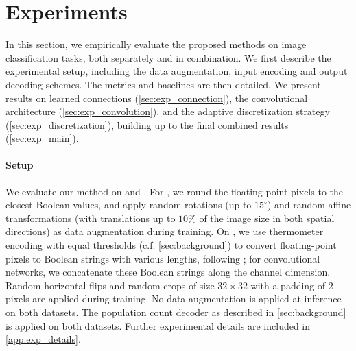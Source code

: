 \section{Experiments} \label{sec:experiments}

In this section, we empirically evaluate the proposed methods on image classification tasks, both separately and in combination. We first describe the experimental setup, including the data augmentation, input encoding and output decoding schemes. The metrics and baselines are
 then detailed. 
 We  present results on learned connections (\cref{sec:exp_connection}), the convolutional architecture (\cref{sec:exp_convolution}), and the adaptive discretization strategy (\cref{sec:exp_discretization}), building up to the final combined results (\cref{sec:exp_main}).

\paragraph{Setup} We evaluate our method on \mnist \citep{lecun1998gradient} and \cifar \citep{krizhevsky2009learning}. For \mnist, we round the floating-point pixels to the 
closest Boolean values,
and apply random rotations (up to $15^\circ$) and random affine transformations
 (with translations up to $10\%$ of the image size in both spatial directions) as 
 data augmentation during training. On \cifar, we use thermometer encoding with equal thresholds (c.f. \cref{sec:background})
 to convert floating-point pixels to Boolean strings
 with various lengths, following  \citet{petersen2022deep,petersen2024convolutional}; for convolutional networks, we concatenate these
Boolean strings
 along the channel dimension. Random horizontal flips and random crops of size $32 \times 32$ with a padding of 2 pixels are applied during training. No data augmentation is applied at inference on both datasets. The population count decoder as described in \cref{sec:background} is applied on both datasets. Further experimental details are included in \cref{app:exp_details}.

